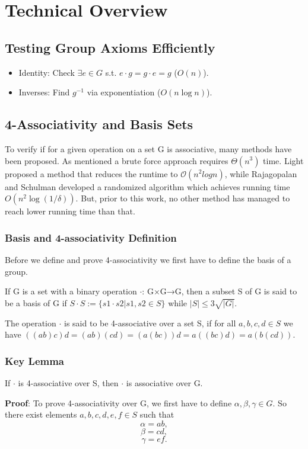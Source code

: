 \documentclass[sigconf]{acmart}
\begin{document}
\section{Technical Overview}
\subsection{Testing Group Axioms Efficiently}
\begin{itemize}
    \item Identity: Check \( \exists e \in G \) s.t. \( e \cdot g = g \cdot e = g \) (\( O(n) \)).
    \item Inverses: Find \( g^{-1} \) via exponentiation (\( O(n \log n) \)).
\end{itemize}

\subsection{4-Associativity and Basis Sets}
To verify if for a given operation on a set G is associative, many methods have been proposed. As mentioned a brute force approach requires \(\Theta(n^3)\) time. Light proposed a method that reduces the runtime to \(\mathcal{O}(n^2logn)\), while Rajagopalan and Schulman developed a randomized algorithm which achieves running time $O(n^2 \log(1/\delta))$. But, prior to this work, no other method has managed to reach lower running time than that.

\subsubsection{Basis and 4-associativity Definition}
Before we define and prove 4-associativity we first have to define the basis of a group.

If G is a set with a binary operation \(\cdot\): G×G→G, then a subset S of G is said to be a basis of G if $S\cdot S := \{s1\cdot s2 |s1,s2 \in S\}$ while $|S|\le3\sqrt{|G|}$.

The operation \(\cdot\) is said to be 4-associative over a set S, if for all $a,b,c,d \in S$ we have $((ab)c)d= (ab)(cd) = (a(bc))d= a((bc)d) = a(b(cd))$.

\subsubsection{Key Lemma}
If \(\cdot\) is 4-associative over S, then \(\cdot\) is associative over G.

\textbf{Proof}:
To prove 4-associativity over G, we first have to define \(\alpha, \beta,\gamma \in G\). So there exist elements \(a,b,c,d,e,f \in S\) such that
\[\alpha = ab,\]
\[\beta = cd,\]
\[\gamma = ef.\]
\end{document}
